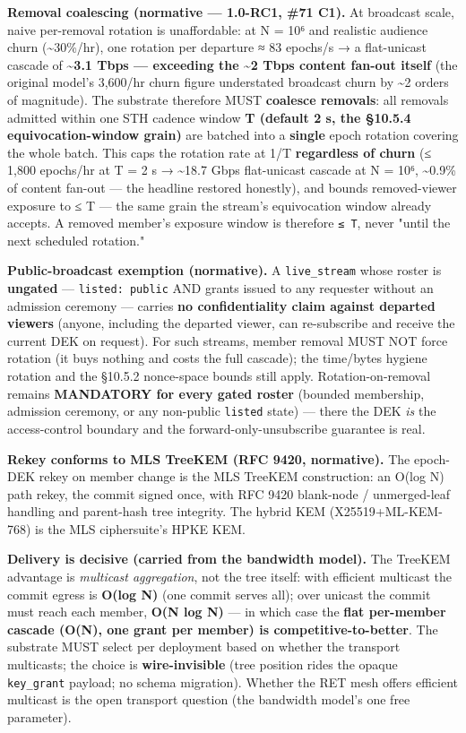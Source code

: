 \documentclass[10pt]{article}
\begin{document}
\textbf{Removal coalescing (normative — 1.0-RC1, \#71 C1).} At broadcast scale, naive per-removal rotation is unaffordable: at N = 10⁶ and realistic audience churn (\textasciitilde{}30\%/hr), one rotation per departure ≈ 83 epochs/s → a flat-unicast cascade of \textbf{\textasciitilde{}3.1 Tbps — exceeding the \textasciitilde{}2 Tbps content fan-out itself} (the original model's 3,600/hr churn figure understated broadcast churn by \textasciitilde{}2 orders of magnitude). The substrate therefore MUST \textbf{coalesce removals}: all removals admitted within one STH cadence window \textbf{T (default 2 s, the §10.5.4 equivocation-window grain)} are batched into a \textbf{single} epoch rotation covering the whole batch. This caps the rotation rate at 1/T \textbf{regardless of churn} (≤ 1,800 epochs/hr at T = 2 s → \textasciitilde{}18.7 Gbps flat-unicast cascade at N = 10⁶, \textasciitilde{}0.9\% of content fan-out — the headline restored honestly), and bounds removed-viewer exposure to ≤ T — the same grain the stream's equivocation window already accepts. A removed member's exposure window is therefore \texttt{≤ T}, never "until the next scheduled rotation."


\textbf{Public-broadcast exemption (normative).} A \texttt{live\_stream} whose roster is \textbf{ungated} — \texttt{listed: public} AND grants issued to any requester without an admission ceremony — carries \textbf{no confidentiality claim against departed viewers} (anyone, including the departed viewer, can re-subscribe and receive the current DEK on request). For such streams, member removal MUST NOT force rotation (it buys nothing and costs the full cascade); the time/bytes hygiene rotation and the §10.5.2 nonce-space bounds still apply. Rotation-on-removal remains \textbf{MANDATORY for every gated roster} (bounded membership, admission ceremony, or any non-public \texttt{listed} state) — there the DEK \textit{is} the access-control boundary and the forward-only-unsubscribe guarantee is real.


\textbf{Rekey conforms to MLS TreeKEM (RFC 9420, normative).} The epoch-DEK rekey on member change is the MLS TreeKEM construction: an O(log N) path rekey, the commit signed once, with RFC 9420 blank-node / unmerged-leaf handling and parent-hash tree integrity. The hybrid KEM (X25519+ML-KEM-768) is the MLS ciphersuite's HPKE KEM.


\textbf{Delivery is decisive (carried from the bandwidth model).} The TreeKEM advantage is \textit{multicast aggregation}, not the tree itself: with efficient multicast the commit egress is \textbf{O(log N)} (one commit serves all); over unicast the commit must reach each member, \textbf{O(N log N)} — in which case the \textbf{flat per-member cascade (O(N), one grant per member) is competitive-to-better}. The substrate MUST select per deployment based on whether the transport multicasts; the choice is \textbf{wire-invisible} (tree position rides the opaque \texttt{key\_grant} payload; no schema migration). Whether the RET mesh offers efficient multicast is the open transport question (the bandwidth model's one free parameter).
\end{document}
